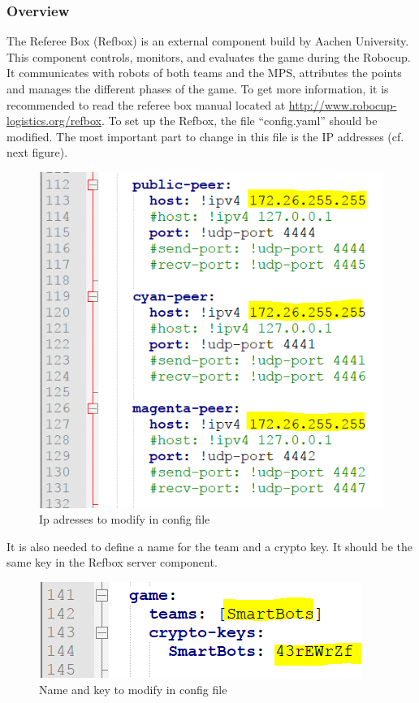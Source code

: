 
\subsubsection{Overview}

The Referee Box (Refbox) is an external component build by Aachen University. This component controls, monitors, and evaluates the game during the Robocup. It communicates with robots of both teams and the MPS, attributes the points and manages the different phases of the game. To get more information, it is recommended to read the referee box manual located at \url{http://www.robocup-logistics.org/refbox}. To set up the Refbox, the file “config.yaml” should be modified. The most important part to change in this file is the IP addresses (cf. next figure). \\

\begin{figure}[!h]
\centering
\includegraphics[]{pic/config_file_1.png}
\caption{Ip adresses to modify in config file}
\label{fig:configFile1}
\end{figure}

It is also needed to define a name for the team and a crypto key. It should be the same key in the Refbox server component.

\begin{figure}[!h]
\centering
\includegraphics[]{pic/config_file_2.png}
\caption{Name and key to modify in config file}
\label{fig:configFile2}
\end{figure}

